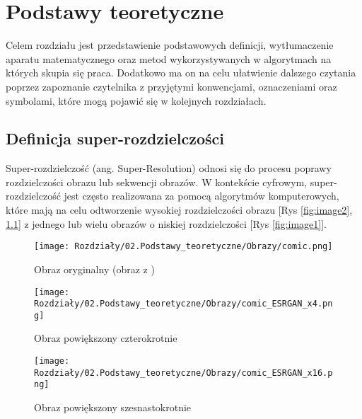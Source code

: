 \chapter{Podstawy teoretyczne} \label{chap:podstawy_teoretyczne}

Celem rozdziału jest przedstawienie podstawowych definicji, wytłumaczenie aparatu matematycznego oraz metod wykorzystywanych w algorytmach na których skupia się praca. Dodatkowo ma on na celu ułatwienie dalszego czytania poprzez zapoznanie czytelnika z przyjętymi konwencjami, oznaczeniami oraz symbolami, które mogą pojawić się w kolejnych rozdziałach. 


\section{Definicja super-rozdzielczości}

Super-rozdzielczość (ang. Super-Resolution) odnosi się do procesu poprawy rozdzielczości obrazu lub sekwencji obrazów. W kontekście cyfrowym, super-rozdzielczość jest często realizowana za pomocą algorytmów komputerowych, które mają na celu odtworzenie wysokiej rozdzielczości obrazu [Rys \ref{fig:image2}, \ref{fig:image3}] z jednego lub wielu obrazów o niskiej rozdzielczości [Rys \ref{fig:image1}].

\begin{figure}[ht]
    \centering
    \begin{minipage}[t]{0.3\linewidth}
        \texttt{[image: Rozdziały/02.Podstawy\_teoretyczne/Obrazy/comic.png]}
        \caption{Obraz oryginalny (obraz z \cite{zeyde2010single})}
        \label{fig:image1}
    \end{minipage}
    \hspace{0.5cm}
    \begin{minipage}[t]{0.3\linewidth}
        \texttt{[image: Rozdziały/02.Podstawy\_teoretyczne/Obrazy/comic\_ESRGAN\_x4.png]}
        \caption{Obraz powiększony czterokrotnie}
        \label{fig:image2}
    \end{minipage}
    \hspace{0.5cm}
    \begin{minipage}[t]{0.3\linewidth}
        \texttt{[image: Rozdziały/02.Podstawy\_teoretyczne/Obrazy/comic\_ESRGAN\_x16.png]}
        \caption{Obraz powiększony szesnastokrotnie}
        \label{fig:image3}
    \end{minipage}
\end{figure}

